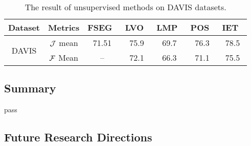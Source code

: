 \begin{table*}[t!h]
	\begin{center}
		\setlength\tabcolsep{3pt}
		\begin{tabular}{|c|c|c|c|c|c|c|}
		\hline
Dataset& Metrics                   &FSEG~\cite{Jain2017FusionSeg}  &LVO~\cite{Tokmakov2017Learning} &LMP~\cite{Tokmakov2017Learning} & POS~\cite{Koh2017Primary} &IET~\cite{li2018instance}\\
\hline
\multirow{2}{*}{DAVIS} &$\mathcal{J}$ mean  &71.51                           &75.9                           &69.7                            &76.3                          &78.5\\
\cline{2-7}
&$\mathcal{F}$ Mean                         &   --                           &72.1                           &66.3                            &71.1                          &75.5\\
\hline

\end{tabular}
\end{center}

\caption{The result of unsupervised methods on DAVIS datasets.}
\label{table:unsuperivsed_all_dataset}
\end{table*}



\subsection{Summary}
pass

\subsection{Future Research Directions}
